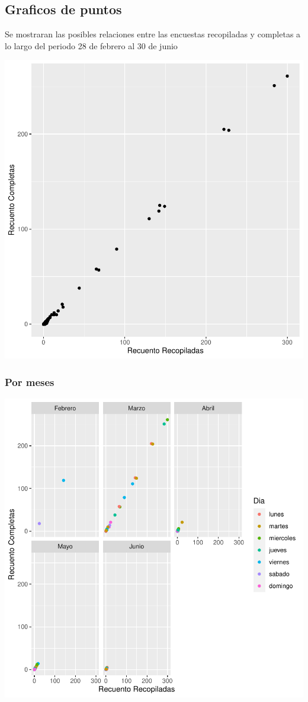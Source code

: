 \documentclass{article}
\begin{document}
\subsection{Graficos de puntos}
Se mostraran las posibles relaciones entre las encuestas recopiladas y completas a lo largo del periodo 28 de febrero al 30 de junio

\includegraphics{seguimento2-014}

\subsubsection{Por meses}

\includegraphics{seguimento2-015}
\end{document}
